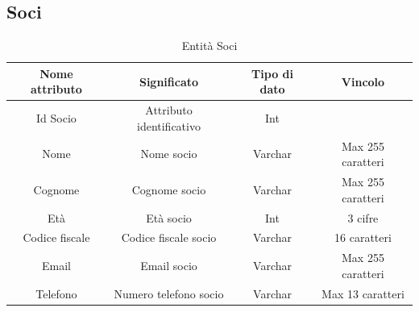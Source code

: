 \documentclass[12pt]{article}
\begin{document}
\subsection{Soci}
\begin{table}[h!]
    \centering
    \begin{tabular}{|c|c|c|c|}
        \hline
        Nome attributo & Significato & Tipo di dato & Vincolo \\
        \hline
        Id Socio & Attributo identificativo & Int & \\
        \hline
        Nome & Nome socio & Varchar & Max 255 caratteri  \\
        \hline
        Cognome & Cognome socio & Varchar & Max 255 caratteri  \\
        \hline
        Età & Età socio & Int & 3 cifre \\
        \hline
        Codice fiscale & Codice fiscale socio & Varchar & 16 caratteri \\
        \hline
        Email & Email socio & Varchar & Max 255 caratteri \\
        \hline
        Telefono & Numero telefono socio & Varchar & Max 13 caratteri \\
        \hline
    \end{tabular}
    \caption{Entità Soci}
    \label{tab:Entità Soci}
\end{table}

\end{document}
